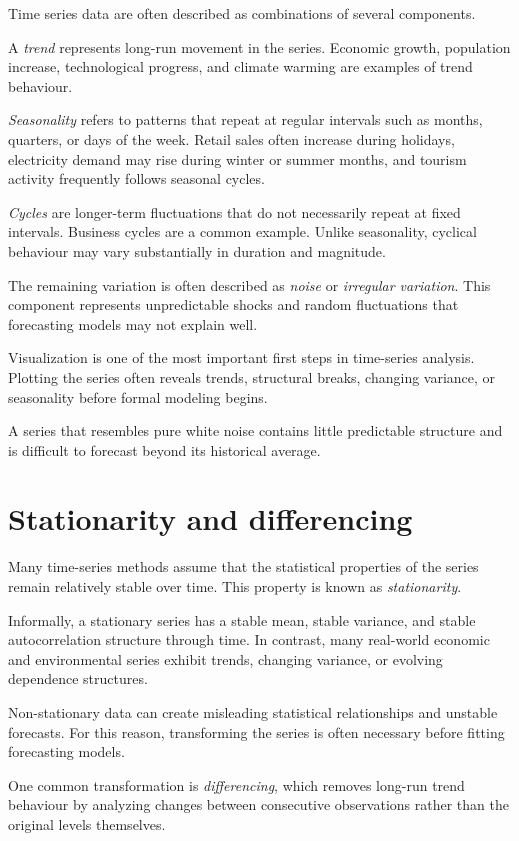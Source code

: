 \documentclass[
  11pt,
  oneside]{book}
\begin{document}
Time series data are often described as combinations of several components.

A \emph{trend} represents long-run movement in the series. Economic growth, population increase, technological progress, and climate warming are examples of trend behaviour.

\emph{Seasonality} refers to patterns that repeat at regular intervals such as months, quarters, or days of the week. Retail sales often increase during holidays, electricity demand may rise during winter or summer months, and tourism activity frequently follows seasonal cycles.

\emph{Cycles} are longer-term fluctuations that do not necessarily repeat at fixed intervals. Business cycles are a common example. Unlike seasonality, cyclical behaviour may vary substantially in duration and magnitude.

The remaining variation is often described as \emph{noise} or \emph{irregular variation}. This component represents unpredictable shocks and random fluctuations that forecasting models may not explain well.

Visualization is one of the most important first steps in time-series analysis. Plotting the series often reveals trends, structural breaks, changing variance, or seasonality before formal modeling begins.

A series that resembles pure white noise contains little predictable structure and is difficult to forecast beyond its historical average.

\section{Stationarity and differencing}\label{stationarity-and-differencing}

Many time-series methods assume that the statistical properties of the series remain relatively stable over time. This property is known as \emph{stationarity}.

Informally, a stationary series has a stable mean, stable variance, and stable autocorrelation structure through time. In contrast, many real-world economic and environmental series exhibit trends, changing variance, or evolving dependence structures.

Non-stationary data can create misleading statistical relationships and unstable forecasts. For this reason, transforming the series is often necessary before fitting forecasting models.

One common transformation is \emph{differencing}, which removes long-run trend behaviour by analyzing changes between consecutive observations rather than the original levels themselves.
\end{document}
